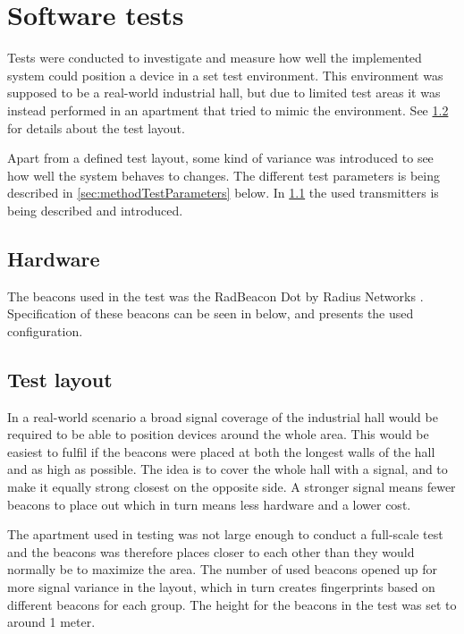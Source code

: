 \section{Software tests}\label{sec:methodSoftwareTests}
Tests were conducted to investigate and measure how well the implemented system could position a device in a set test environment.
This environment was supposed to be a real-world industrial hall, but due to limited test areas it was instead performed in an apartment that tried to mimic the environment.
See \cref{sec:methodTestLayout} for details about the test layout.

\bigskip

Apart from a defined test layout, some kind of variance was introduced to see how well the system behaves to changes. The different test parameters is being described in \cref{sec:methodTestParameters} below.
In \cref{sec:methodTestHardware} the used transmitters is being described and introduced.


\subsection{Hardware}\label{sec:methodTestHardware}
The beacons used in the test was the RadBeacon Dot by Radius Networks \cite{RadBeaconDotDatasheet}.
Specification of these beacons can be seen in  below, and  presents the used configuration.




\subsection{Test layout}\label{sec:methodTestLayout}
In a real-world scenario a broad signal coverage of the industrial hall would be required to be able to position devices around the whole area.
This would be easiest to fulfil if the beacons were placed at both the longest walls of the hall and as high as possible.
The idea is to cover the whole hall with a signal, and to make it equally strong closest on the opposite side.
A stronger signal means fewer beacons to place out which in turn means less hardware and a lower cost.

\bigskip

The apartment used in testing was not large enough to conduct a full-scale test and the beacons was therefore places closer to each other than they would normally be to maximize the area.
The number of used beacons opened up for more signal variance in the layout, which in turn creates fingerprints based on different beacons for each group.
The height for the beacons in the test was set to around 1 meter.

